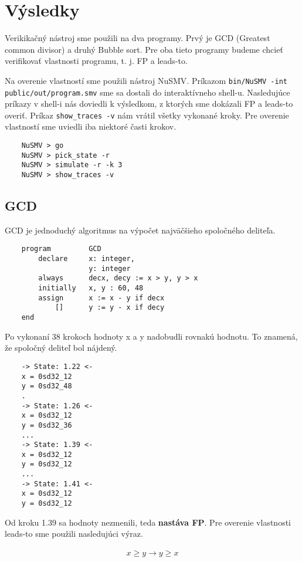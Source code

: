 \chapter{Výsledky}\label{chap:conclusion}
Verikikačný nástroj sme použili na dva programy. Prvý je GCD 
(Greatest common divisor) a druhý Bubble sort. Pre oba tieto programy budeme chcieť
verifikovať vlastnosti programu, t. j. FP a leads-to. 

Na overenie vlastností sme použili nástroj NuSMV. Príkazom 
\texttt{bin/NuSMV -int public/out/program.smv} sme sa dostali do interaktívneho shell-u. 
Nasledujúce príkazy v shell-i nás doviedli k výsledkom, z ktorých sme dokázali FP a leads-to 
overiť. Príkaz \texttt{show\_traces -v} nám vrátil všetky vykonané kroky. 
Pre overenie vlastností sme uviedli iba niektoré časti krokov.

\begin{lstlisting}
    NuSMV > go
    NuSMV > pick_state -r
    NuSMV > simulate -r -k 3
    NuSMV > show_traces -v
\end{lstlisting}

\section{GCD}
GCD je jednoduchý algoritmus na výpočet najväčšieho spoločného deliteľa.
\begin{lstlisting}
    program         GCD
        declare     x: integer, 
                    y: integer
        always      decx, decy := x > y, y > x
        initially   x, y : 60, 48
        assign      x := x - y if decx
            []      y := y - x if decy
    end
\end{lstlisting}

Po vykonaní 38 krokoch hodnoty x a y nadobudli rovnakú hodnotu. To znamená, že spoločný
deliteľ bol nájdený.

\begin{lstlisting}
    -> State: 1.22 <-
    x = 0sd32_12
    y = 0sd32_48
    .
    -> State: 1.26 <-
    x = 0sd32_12
    y = 0sd32_36
    ...
    -> State: 1.39 <-
    x = 0sd32_12
    y = 0sd32_12
    ...
    -> State: 1.41 <-
    x = 0sd32_12
    y = 0sd32_12
\end{lstlisting}

Od kroku 1.39 sa hodnoty nezmenili, teda \textbf{nastáva FP}. Pre overenie vlastnosti 
leads-to sme použili nasledujúci výraz.
\begin{ceqn}
    \begin{align*}
        x \geq y \rightarrow y \geq x
    \end{align*}
\end{ceqn}


